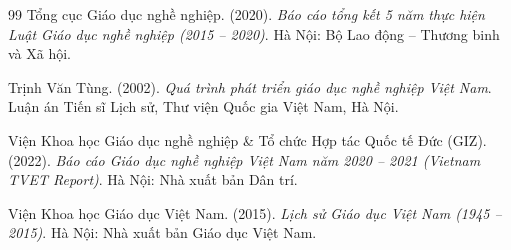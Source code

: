\begin{thebibliography}{99}
Tổng cục Giáo dục nghề nghiệp. (2020). \textit{Báo cáo tổng kết 5 năm thực hiện Luật Giáo dục nghề nghiệp (2015 -- 2020)}. Hà Nội: Bộ Lao động -- Thương binh và Xã hội.

Trịnh Văn Tùng. (2002). \textit{Quá trình phát triển giáo dục nghề nghiệp Việt Nam}. Luận án Tiến sĩ Lịch sử, Thư viện Quốc gia Việt Nam, Hà Nội.

Viện Khoa học Giáo dục nghề nghiệp \& Tổ chức Hợp tác Quốc tế Đức (GIZ). (2022). \textit{Báo cáo Giáo dục nghề nghiệp Việt Nam năm 2020 -- 2021 (Vietnam TVET Report)}. Hà Nội: Nhà xuất bản Dân trí.

Viện Khoa học Giáo dục Việt Nam. (2015). \textit{Lịch sử Giáo dục Việt Nam (1945 -- 2015)}. Hà Nội: Nhà xuất bản Giáo dục Việt Nam.

\end{thebibliography}
